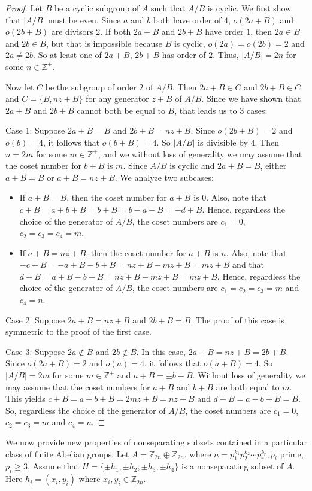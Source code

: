 \documentclass[article,dvisp]{amsart}
\def\Z{\mathbb{Z}}
\theoremstyle{definition}
\theoremstyle{remark}
\numberwithin{equation}{section}
\theoremstyle{lemma}
\begin{document}
\begin{proof} Let $B$ be a cyclic subgroup of $A$ such that $A/B$ is cyclic. We first show that $|A/B|$ must be even. Since $a$ and $b$ both have order of $4$, $o(2a+B)$ and $o(2b+B)$ are divisors $2$. If both $2a+B$ and $2b+B$ have order $1$, then $2a\in B$ and $2b\in B$, but that is impossible because $B$ is cyclic, $o(2a)=o(2b)=2$ and $2a\neq2b$. So at least one of $2a+B$, $2b+B$ has order of $2$. Thus, $|A/B|=2n$ for some $n\in\Z^{+}$.

Now let $C$ be the subgroup of order $2$ of $A/B$. Then $2a+B\in C$ and $2b+B\in C$ and $C=\{B,nz+B\}$ for any generator $z+B$ of $A/B$. Since we have shown that $2a+B$ and $2b+B$ cannot both be equal to $B$, that leads us to 3 cases:

Case 1: Suppose $2a+B=B$ and $2b+B=nz+B$. Since $o(2b+B)=2$ and $o(b)=4$, it follows that $o(b+B)=4$. So $|A/B|$ is divisible by $4$. Then $n=2m$ for some $m\in\Z^{+}$, and we without loss of generality we may assume that the coset number for $b+B$ is $m$. Since $A/B$ is cyclic and $2a+B=B$, either $a+B=B$ or $a+B=nz+B$. We analyze two subcases:
\begin{itemize}
\item If $a+B=B$, then the coset number for $a+B$ is $0$. Also, note that $c+B=a+b+B=b+B=b-a+B=-d+B$. Hence, regardless the choice of the generator of $A/B$, the coset numbers are $c_{1}=0$, $c_{2}=c_{3}=c_{4}=m$. 
\item If $a+B=nz+B$, then the coset number for $a+B$ is $n$. Also, note that $-c+B=-a+B-b+B=nz+B-mz+B=mz+B$ and that $d+B=a+B-b+B=nz+B-mz+B=mz+B$. Hence, regardless the choice of the generator of $A/B$, the coset numbers are $c_{1}=c_{2}=c_{3}=m$ and $c_{4}=n$. 
\end{itemize}

Case 2: Suppose $2a+B=nz+B$ and $2b+B=B$. The proof of this case is symmetric to the proof of the first case.

Case 3: Suppose $2a\notin B$ and $2b\notin B$. In this case, $2a+B=nz+B=2b+B$. Since $o(2a+B)=2$ and $o(a)=4$, it follows that $o(a+B)=4$. So $|A/B|=2m$ for some $m\in\Z^{+}$ and $a+B=\pm b+B$. Without loss of generality we may assume that the coset numbers for $a+B$ and $b+B$ are both equal to $m$. This yields
$c+B=a+b+B=2mz+B=nz+B$ and $d+B=a-b+B=B$. So, regardless the choice of the generator of $A/B$, the coset numbers are $c_{1}=0$, $c_{2}=c_{3}=m$ and $c_{4}=n$.\end{proof}

We now provide new properties of nonseparating subsets contained in a particular class of finite Abelian groups. Let $A=\Z_{2n}\oplus \Z_{2n}$, where $n=p_{1}^{k_{1}}p_{2}^{k_{2}}\cdots p_{r}^{k_{r}}, p_{i}$ prime, $p_{i}\geq3$, Assume that $H=\{\pm h_{1},\pm h_{2},\pm h_{3},\pm h_{4}\}$ is a nonseparating subset of $A$. Here $h_{i}=(x_{i},y_{i})$ where $x_{i},y_{i}\in \Z_{2n}$.
\end{document}
